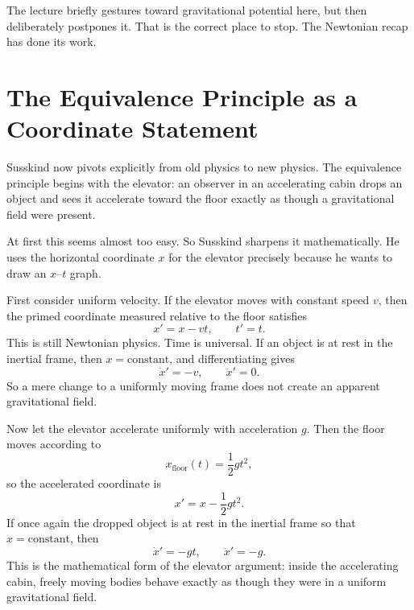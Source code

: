 The lecture briefly gestures toward gravitational potential here, but then deliberately postpones it. That is the correct place to stop. The Newtonian recap has done its work.

\section{The Equivalence Principle as a Coordinate Statement}

Susskind now pivots explicitly from old physics to new physics. The equivalence principle begins with the elevator: an observer in an accelerating cabin drops an object and sees it accelerate toward the floor exactly as though a gravitational field were present.

At first this seems almost too easy. So Susskind sharpens it mathematically. He uses the horizontal coordinate $x$ for the elevator precisely because he wants to draw an $x$--$t$ graph.

First consider uniform velocity. If the elevator moves with constant speed $v$, then the primed coordinate measured relative to the floor satisfies
\begin{equation}
x' = x-vt,
\qquad
t'=t.
\end{equation}
This is still Newtonian physics. Time is universal. If an object is at rest in the inertial frame, then $x=\text{constant}$, and differentiating gives
\begin{equation}
\dot x' = -v,
\qquad
\ddot x'=0.
\end{equation}
So a mere change to a uniformly moving frame does not create an apparent gravitational field.

Now let the elevator accelerate uniformly with acceleration $g$. Then the floor moves according to
\begin{equation}
x_{\mathrm{floor}}(t)=\frac{1}{2}gt^2,
\end{equation}
so the accelerated coordinate is
\begin{equation}
x' = x-\frac{1}{2}gt^2.
\end{equation}
If once again the dropped object is at rest in the inertial frame so that $x=\text{constant}$, then
\begin{equation}
\dot x' = -gt,
\qquad
\ddot x'=-g.
\end{equation}
This is the mathematical form of the elevator argument: inside the accelerating cabin, freely moving bodies behave exactly as though they were in a uniform gravitational field.

